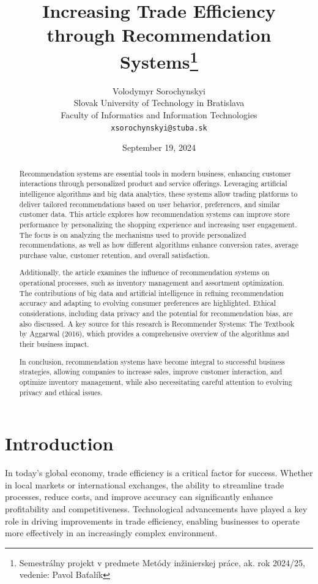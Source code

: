 \documentclass[10pt,twocolumn,twoside,slovak,a4paper]{article}
\title{Increasing Trade Efficiency through Recommendation Systems\thanks{Semestrálny projekt v predmete Metódy inžinierskej práce, ak. rok 2024/25, vedenie: Pavol Baťalík}} %
\author{Volodymyr Sorochynskyi\\[2pt]
	{\small Slovak University of Technology in Bratislava}\\
	{\small Faculty of Informatics and Information Technologies}\\
	{\small \texttt{xsorochynskyi@stuba.sk}}
	}
\date{\small September 19, 2024} %
\begin{document}
\maketitle

\begin{abstract}
Recommendation systems are essential tools in modern business, enhancing customer interactions through personalized product and service offerings. Leveraging artificial intelligence algorithms and big data analytics, these systems allow trading platforms to deliver tailored recommendations based on user behavior, preferences, and similar customer data. This article explores how recommendation systems can improve store performance by personalizing the shopping experience and increasing user engagement. The focus is on analyzing the mechanisms used to provide personalized recommendations, as well as how different algorithms enhance conversion rates, average purchase value, customer retention, and overall satisfaction.

Additionally, the article examines the influence of recommendation systems on operational processes, such as inventory management and assortment optimization. The contributions of big data and artificial intelligence in refining recommendation accuracy and adapting to evolving consumer preferences are highlighted. Ethical considerations, including data privacy and the potential for recommendation bias, are also discussed. A key source for this research is Recommender Systems: The Textbook by Aggarwal (2016), which provides a comprehensive overview of the algorithms and their business impact.

In conclusion, recommendation systems have become integral to successful business strategies, allowing companies to increase sales, improve customer interaction, and optimize inventory management, while also necessitating careful attention to evolving privacy and ethical issues.
\end{abstract}



\section{Introduction}

In today’s global economy, trade efficiency is a critical factor for success. Whether in local markets or international exchanges, the ability to streamline trade processes, reduce costs, and improve accuracy can significantly enhance profitability and competitiveness. Technological advancements have played a key role in driving improvements in trade efficiency, enabling businesses to operate more effectively in an increasingly complex environment.
\end{document}
